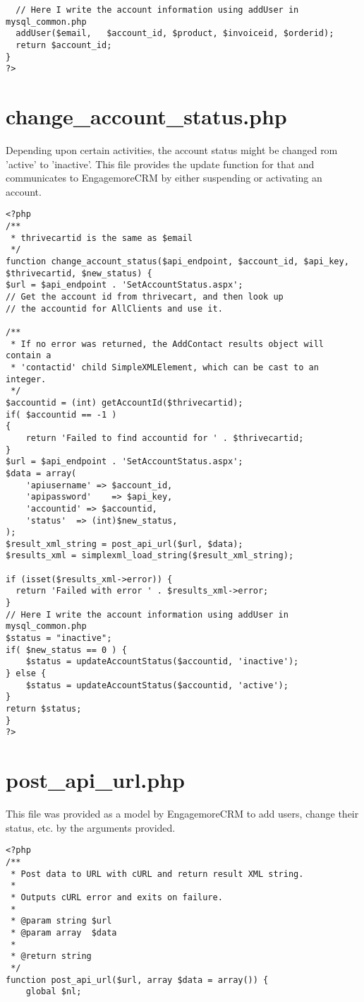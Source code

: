 \documentclass[final,letterpaper,12pt]{article}
\begin{document}
\begin{appendices}
\begin{verbatim}
  // Here I write the account information using addUser in mysql_common.php
  addUser($email,   $account_id, $product, $invoiceid, $orderid);
  return $account_id;
}
?>
\end{verbatim}
\section{change\_account\_status.php}
\noindent Depending upon certain activities, the account status might be changed rom 'active' to 'inactive'.  This file provides the update function for that and communicates to EngagemoreCRM by either suspending or activating an account.
\begin{verbatim}
<?php
/**
 * thrivecartid is the same as $email
 */
function change_account_status($api_endpoint, $account_id, $api_key, $thrivecartid, $new_status) {
$url = $api_endpoint . 'SetAccountStatus.aspx';
// Get the account id from thrivecart, and then look up
// the accountid for AllClients and use it.

/**
 * If no error was returned, the AddContact results object will contain a
 * 'contactid' child SimpleXMLElement, which can be cast to an integer.
 */
$accountid = (int) getAccountId($thrivecartid);
if( $accountid == -1 )
{
	return 'Failed to find accountid for ' . $thrivecartid;
}
$url = $api_endpoint . 'SetAccountStatus.aspx';
$data = array(
	'apiusername' => $account_id,
	'apipassword'    => $api_key,
	'accountid' => $accountid,
	'status'  => (int)$new_status,
);
$result_xml_string = post_api_url($url, $data);
$results_xml = simplexml_load_string($result_xml_string);

if (isset($results_xml->error)) {
  return 'Failed with error ' . $results_xml->error;
}
// Here I write the account information using addUser in mysql_common.php
$status = "inactive";
if( $new_status == 0 ) {
	$status = updateAccountStatus($accountid, 'inactive');
} else {
	$status = updateAccountStatus($accountid, 'active');
}
return $status;
}
?>
\end{verbatim}
\section{post\_api\_url.php}
\noindent This file was provided as a model by EngagemoreCRM to add users, change their status, etc. by the arguments provided.
\begin{verbatim}
<?php
/**
 * Post data to URL with cURL and return result XML string.
 *
 * Outputs cURL error and exits on failure.
 *
 * @param string $url
 * @param array  $data
 *
 * @return string
 */
function post_api_url($url, array $data = array()) {
	global $nl;


\end{verbatim}
\end{appendices}
\end{document}

